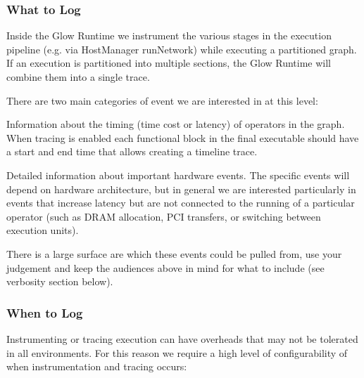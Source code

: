 \subsubsection*{What to Log}

Inside the Glow Runtime we instrument the various stages in the execution pipeline (e.\+g. via Host\+Manager run\+Network) while executing a partitioned graph. If an execution is partitioned into multiple sections, the Glow Runtime will combine them into a single trace.

There are two main categories of event we are interested in at this level\+:


\begin{DoxyItemize}
\item Information about the timing (time cost or latency) of operators in the graph. When tracing is enabled each functional block in the final executable should have a start and end time that allows creating a timeline trace.
\item Detailed information about important hardware events. The specific events will depend on hardware architecture, but in general we are interested particularly in events that increase latency but are not connected to the running of a particular operator (such as D\+R\+AM allocation, P\+CI transfers, or switching between execution units).
\end{DoxyItemize}

 There is a large surface are which these events could be pulled from, use your judgement and keep the audiences above in mind for what to include (see verbosity section below).

\subsubsection*{When to Log}

Instrumenting or tracing execution can have overheads that may not be tolerated in all environments. For this reason we require a high level of configurability of when instrumentation and tracing occurs\+:


